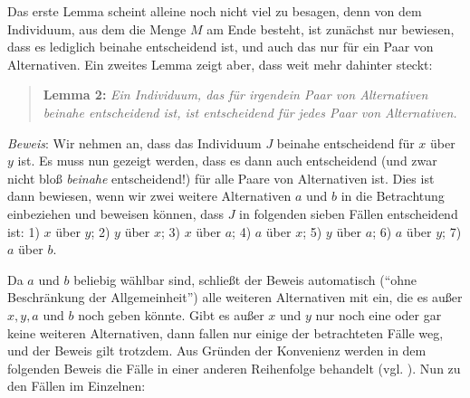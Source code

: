 Das erste Lemma scheint alleine noch nicht viel zu besagen, denn von dem
Individuum, aus dem die Menge $M$ am Ende besteht, ist zunächst nur bewiesen, dass es
lediglich beinahe entscheidend ist, und auch das nur für ein Paar von
Alternativen. Ein zweites Lemma zeigt aber, dass weit mehr dahinter steckt: 

\begin{quote}
{\bf Lemma 2:} {\em Ein Individuum,
das für irgendein Paar von Alternativen beinahe entscheidend ist, ist
entscheidend für jedes Paar von Alternativen.}
\end{quote}

{\em Beweis}: Wir nehmen an, dass das Individuum $J$ beinahe entscheidend für
$x$ über $y$ ist. Es muss nun gezeigt werden, dass es dann auch entscheidend
(und zwar nicht bloß {\em beinahe} entscheidend!) für alle Paare von
Alternativen ist. Dies ist dann bewiesen, wenn wir zwei weitere
Alternativen $a$ und $b$ in die Betrachtung einbeziehen und beweisen können,
dass $J$ in folgenden sieben Fällen entscheidend ist: 1) $x$ über $y$; 
2) $y$ über $x$; 3) $x$ über $a$; 4) $a$ über $x$; 5) $y$ über $a$; 6) $a$ über
$y$; 7) $a$ über $b$. 

Da $a$ und $b$ beliebig wählbar sind, schließt der Beweis automatisch ("`ohne
Beschränkung der Allgemeinheit"') alle weiteren Alternativen mit ein, die es
außer $x,y,a$ und $b$ noch geben könnte. Gibt es außer $x$ und $y$ nur noch eine
oder gar keine weiteren Alternativen, dann fallen nur einige der betrachteten
Fälle weg, und der Beweis gilt trotzdem. Aus Gründen der Konvenienz werden in dem
folgenden Beweis die Fälle in einer anderen Reihenfolge behandelt (vgl.
\cite[S.190/191]{resnik:1987}). Nun zu den Fällen im Einzelnen:

